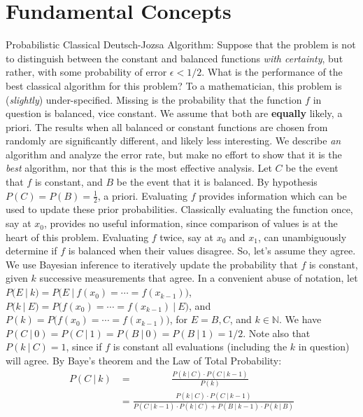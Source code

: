 
\chapter{Fundamental Concepts}
 Probabilistic Classical Deutsch-Jozsa Algorithm: Suppose that the problem is not to distinguish between the constant and balanced functions \textit{with certainty}, but rather, with some probability of error $\epsilon < 1/2$.  What is the performance of the best classical algorithm for this problem?
\Soln  To a mathematician, this problem is (\textit{slightly}) under-specified.  Missing is the probability that the function $f$ in question is balanced, vice constant.  We assume that both are \textbf{equally} likely, a priori.  The results when all balanced or constant functions are chosen from randomly are significantly different, and likely less interesting.
We describe \textit{an} algorithm and analyze the error rate, but make no effort to show that it is the \textit{best} algorithm, nor that this is the most effective analysis. Let $C$ be the event that $f$ is constant, and $B$ be the event that it is balanced.  By hypothesis $P(C)=P(B)=\frac12$, a  priori.  Evaluating $f$ provides information which can be used to update these prior probabilities.  Classically evaluating the function once, say at $x_0$, provides no useful information, since comparison of values is at the heart of this problem.  Evaluating $f$ twice, say at $x_0$ and $x_1$, can unambiguously determine if $f$ is balanced when their values disagree.  So, let's assume they agree.  We use Bayesian inference to iteratively update the probability that $f$ is constant, given $k$ successive measurements that agree.  In a convenient abuse of notation, let $P(E\ |\ k) = P\bigl(E\ |\ f(x_0) = \cdots = f(x_{k-1})\bigr)$, $P(k\ |\ E) = P\bigl(f(x_0) = \cdots = f(x_{k-1})\ |\ E\bigr)$, and $P(k) =  P\bigl(f(x_0) = \cdots = f(x_{k-1})\bigr)$, for $E=B,C$, and $k\in\mathbb{N}$.  We have $P(C\ |\ 0)=P(C\ |\ 1)=P(B\ |\ 0)=P(B\ |\ 1) = 1/2$.  Note also that $P(k\ |\ C) = 1$, since if $f$ is constant all evaluations (including the $k$ in question) will agree.
By Baye's theorem and the Law of Total Probability:
\begin{align*}
P(C\ |\  k)&=\ \ \ \ \ \ \ \ \ \ \ \ \ \ \ \ \ \ \frac{P(k\ |\  C)\cdot P(C\ |\ k-1)}{P(k)} \\
&=\frac{P(k\ |\ C)\cdot P(C\ |\ k-1)}{ P(C\ |\ k-1) \cdot P(k\ |\ C) +  P(B\ |\ k-1) \cdot P(k\ |\ B)}
\end{align*}

